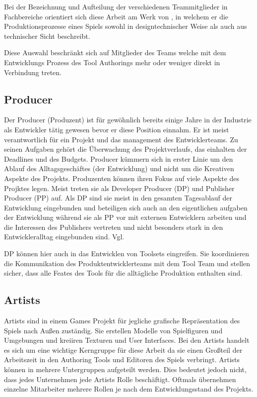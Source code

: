 \documentclass[pagesize, paper=a4, fontsize=12pt, titlepage=true, headings=small, headnosepline, abstractoff, liststotoc, nochapterprefix, plainheadsepline, twoside]{scrreprt}
\begin{document}
Bei der Bezeichnung und Aufteilung der verschiedenen Teammitglieder in Fachbereiche orientiert sich diese Arbeit am Werk von , in welchem er die Produktionsprozesse eines Spiels sowohl in designtechnischer Weise als auch aus technischer Sicht beschreibt.

Diese Auswahl beschränkt sich auf Mitglieder des Teams welche mit dem Entwicklungs Prozess des Tool Authorings mehr oder weniger direkt in Verbindung treten.

\subsection{Producer}
Der Producer (Produzent) ist für gewöhnlich bereits einige Jahre in der Industrie als Entwickler tätig gewesen bevor er diese Position einnahm. Er ist meist verantwortlich für ein Projekt und das management des Entwicklerteams. Zu seinen Aufgaben gehört die Überwachung des Projektverlaufs, das einhalten der Deadlines und des Budgets. Producer kümmern sich in erster Linie um den Ablauf des Alltagsgeschäftes (der Entwicklung) und nicht um die Kreativen Aspekte des Projekts. Produzenten können ihren Fokus auf viele Aspekte des Projktes legen. Meist treten sie als Developer Producer (DP) und Publisher Producer (PP) auf. Als DP sind sie meist in den gesamten Tagesablauf der Entwicklung eingebunden und beteiligen sich auch an den eigentlichen aufgaben der Entwicklung während sie als PP vor mit externen Entwicklern arbeiten und die Interessen des Publishers vertreten und nicht besonders stark in den Entwickleralltag eingebunden sind. Vgl. 

DP können hier auch in das Entwicklen von Toolsets eingreifen. Sie koordinieren die Kommunikation des Produktentwicklerteams mit dem Tool Team und stellen sicher, dass alle Feates des Tools für die alltägliche Produktion enthalten sind.

\subsection{Artists}
Artists sind in einem Games Projekt für jegliche grafische Repräsentation des Spiels nach Außen zuständig. Sie erstellen Modelle von Spielfiguren und Umgebungen und kreiiren Texturen und User Interfaces. Bei den Artists handelt es sich um eine wichtige Kerngruppe für diese Arbeit da sie einen Großteil der Arbeitszeit in den Authoring Tools und Editoren des Spiels verbringt. Artists können in mehrere Untergruppen aufgeteilt werden. Dies bedeutet jedoch nicht, dass jedes Unternehmen jede Artists Rolle beschäftigt. Oftmals übernehmen einzelne Mitarbeiter mehrere Rollen je nach dem Entwicklungsstand des Projekts.
\end{document}
